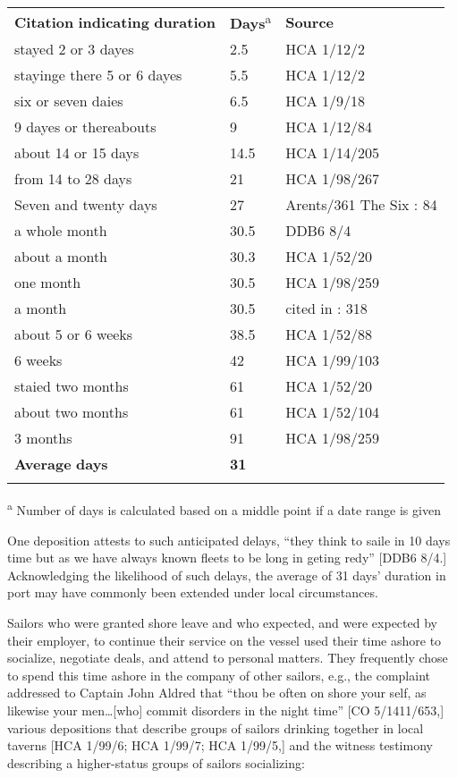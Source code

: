 \begin{tabularx}{\textwidth}{XXX}
\lsptoprule

\textbf{Citation} \textbf{indicating} \textbf{duration} & \textbf{Days}\textsuperscript{a} & \textbf{Source}\\
 stayed 2 or 3 dayes & 2.5 & HCA 1/12/2\\
stayinge there 5 or 6 dayes & 5.5 & HCA 1/12/2\\
six or seven daies & 6.5 & HCA 1/9/18\\
9 dayes or thereabouts & 9 & HCA 1/12/84\\
about 14 or 15 days & 14.5 & HCA 1/14/205\\
from 14 to 28 days & 21 & HCA 1/98/267\\
Seven and twenty days & 27 & Arents/361 The Six \citealt{Voyages1678}: 84\\
a whole month & 30.5 & DDB6 8/4\\
about a month & 30.3 & HCA 1/52/20\\
one month & 30.5 & HCA 1/98/259\\
a month & 30.5 & cited in \citealt{Bicheno2012}: 318\\
about 5 or 6 weeks & 38.5 & HCA 1/52/88\\
6 weeks & 42 & HCA 1/99/103\\
staied two months & 61 & HCA 1/52/20\\
about two months & 61 & HCA 1/52/104\\
3 months & 91 & HCA 1/98/259\\
 \textbf{Average} \textbf{days} & \textbf{31} & \\
\lspbottomrule
\end{tabularx}
\textsuperscript{a}\textbf{\textsuperscript{} }Number of days is calculated based on a middle point if a date range is given 

One deposition attests to such anticipated delays, “they think to saile in 10 days time but as we have always known fleets to be long in geting redy” [DDB6 8/4.] Acknowledging the likelihood of such delays, the average of 31 days’ duration in port may have commonly been extended under local circumstances.

  Sailors who were granted shore leave and who expected, and were expected by their employer, to continue their service on the vessel used their time ashore to socialize, negotiate deals, and attend to personal matters. They frequently chose to spend this time ashore in the company of other sailors, e.g., the complaint addressed to Captain John Aldred that “thou be often on shore your self, as likewise your men…[who] commit disorders in the night time” [CO 5/1411/653,] various depositions that describe groups of sailors drinking together in local taverns [HCA 1/99/6; HCA 1/99/7; HCA 1/99/5,] and the witness testimony describing a higher-status groups of sailors socializing:

